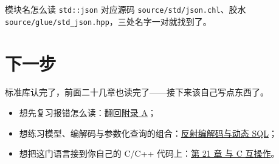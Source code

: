 \begin{tip}{模块名怎么读}
\texttt{std:\allowbreak{}:\allowbreak{}json} 对应源码 \texttt{source/\allowbreak{}std/\allowbreak{}json.\allowbreak{}chl}、胶水 \texttt{source/\allowbreak{}glue/\allowbreak{}std\_json.\allowbreak{}hpp}，三处名字一对就找到了。
\end{tip}

\section{下一步}

标准库认完了，前面二十几章也读完了——接下来该自己写点东西了。

\begin{itemize}

\item 想先复习报错怎么读：翻回\hyperref[ch:appA]{附录 A}；

\item 想练习模型、编解码与参数化查询的组合：\href{https://gitee.com/rabbitc999/chali/blob/master/doc/36-reflection-serialization-sql.md}{反射编解码与动态 SQL}；

\item 想把这门语言接到你自己的 C/C++ 代码上：\hyperref[ch:21]{第 21 章 与 C 互操作}。

\end{itemize}
